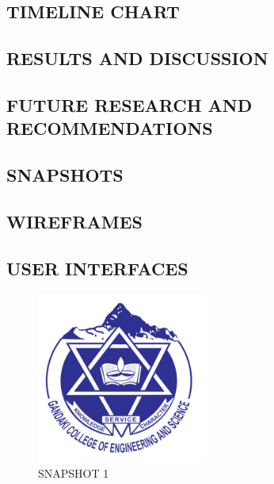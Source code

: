 \documentclass[a4paper, 14pt]{report}
\begin{document}
\begin{description}
	\begin{center}
		\chapter{TIMELINE CHART}
	\end{center}
	
	\begin{center}
		\chapter{RESULTS AND DISCUSSION}
	\end{center}
	\section{FUTURE RESEARCH AND RECOMMENDATIONS}

	\begin{center}
		\chapter{SNAPSHOTS}
	\end{center}
	\section{WIREFRAMES}
	\newpage
	\section{USER INTERFACES}
	
	
\begin{center}
	\begin{figure}[h!]
  \includegraphics[width=0.5\textwidth]{gces.png}
  \caption{SNAPSHOT 1}
\end{figure}


\end{center}
\end{description}
\end{document}
